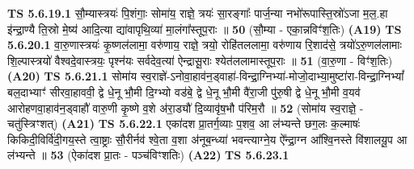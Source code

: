 \documentclass[17pt]{extarticle}
\begin{document}
                                        \textbf{ TS 5.6.19.1} \newline
                  सौ॒म्यास्त्रयः॑ पि॒शंगाः॒ सोमा॑य॒ राज्ञे॒ त्रयः॑ सा॒रङ्गाः᳚ पार्ज॒न्या नभो॑रूपास्ति॒स्रो॑ऽजा म॒ल॒.हा इ॑न्द्रा॒ण्यै ति॒स्रो मे॒ष्य॑ आदि॒त्या द्या॑वापृथि॒व्या॑ मा॒लंगा᳚स्तूप॒राः ॥ \textbf{  50} \newline
                  \newline
                      (सौ॒म्या - एका॒न्नविꣳ॑श॒तिः)  \textbf{(A19)} \newline \newline
                                        \textbf{ TS 5.6.20.1} \newline
                  वा॒रु॒णास्त्रयः॑ कृ॒ष्णल॑लामा॒ वरु॑णाय॒ राज्ञे॒ त्रयो॒ रोहि॑तललामा॒ वरु॑णाय रि॒शाद॑से॒ त्रयो॑ऽरु॒णल॑लामाः शि॒ल्पास्त्रयो॑ वैश्वदे॒वास्त्रयः॒ पृश्न॑यः सर्वदेव॒त्या॑ ऐन्द्रासू॒राः श्येत॑ललामास्तूप॒राः ॥ \textbf{  51} \newline
                  \newline
                      (वा॒रु॒णा - विꣳ॑श॒तिः)  \textbf{(A20)} \newline \newline
                                        \textbf{ TS 5.6.21.1} \newline
                  सोमा॑य स्व॒राज्ञे॑-ऽनोवा॒हाव॑न॒ड्वाहा॑-विन्द्रा॒ग्निभ्या॑-मोजो॒दाभ्या॒मुष्टा॑रा-विन्द्रा॒ग्निभ्यां᳚ बल॒दाभ्याꣳ॑ सीरवा॒हाववी॒ द्वे धे॒नू भौ॒मी दि॒ग्भ्यो वड॑बे॒ द्वे धे॒नू भौ॒मी वै॑रा॒जी पु॑रु॒षी द्वे धे॒नू भौ॒मी व॒यव॑ आरोहणवा॒हाव॑न॒ड्वाहौ॑ वारु॒णी कृ॒ष्णे व॒शे अ॑रा॒ड्यौ॑ दि॒व्यावृ॑ष॒भौ प॑रिम॒रौ ॥ \textbf{  52 } \newline
                  \newline
                      (सोमा॑य स्व॒राज्ञे॒ - चतु॑स्त्रिꣳशत्)  \textbf{(A21)} \newline \newline
                                        \textbf{ TS 5.6.22.1} \newline
                  एका॑दश प्रा॒तर्ग॒व्याः प॒शव॒ आ ल॑भ्यन्ते छग॒लः क॒ल्माषः॑ किकिदी॒विर्वि॑दी॒गय॒स्ते त्वा॒ष्ट्राः सौ॒रीर्नव॑ श्वे॒ता व॒शा अ॑नूब॒न्ध्या॑ भवन्त्याग्ने॒य ऐ᳚न्द्रा॒ग्न आ᳚श्वि॒नस्ते वि॑शालयू॒प आ ल॑भ्यन्ते ॥ \textbf{  53} \newline
                  \newline
                      (ऐका॑दश प्रा॒तः - पञ्च॑विꣳशतिः)  \textbf{(A22)} \newline \newline
                                        \textbf{ TS 5.6.23.1} \newline
\end{document}
